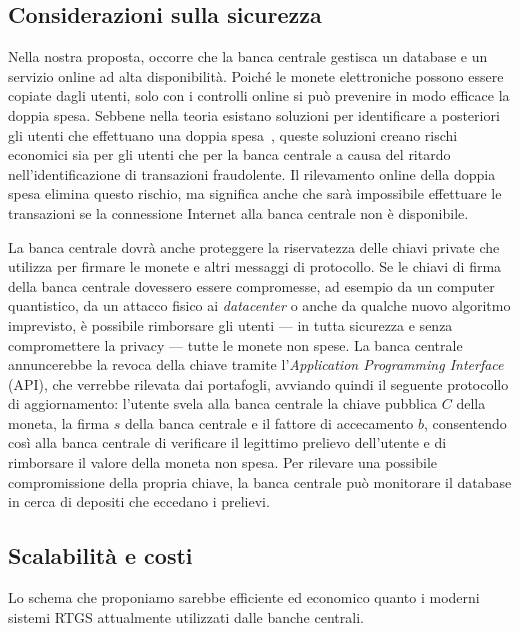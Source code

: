 \documentclass{article}
\begin{document}
\hypertarget{considerazioni-sulla-sicurezza}{%
\subsection{Considerazioni sulla sicurezza}
\label{considerazioni-sulla-sicurezza}}

Nella nostra proposta, occorre che la banca centrale gestisca un 
database e un servizio online ad alta disponibilità. Poiché le monete 
elettroniche possono essere copiate dagli utenti, solo con i controlli 
online si può prevenire in modo efficace la doppia spesa. Sebbene 
nella teoria esistano soluzioni per identificare a posteriori gli 
utenti che effettuano una doppia spesa~\cite[vedi][]{Chaum1990}, 
queste soluzioni creano rischi economici sia per gli utenti che per la 
banca centrale a causa del ritardo nell'identificazione di 
transazioni fraudolente. Il rilevamento online della doppia spesa 
elimina questo rischio, ma significa anche che sarà impossibile 
effettuare le transazioni se la connessione Internet alla banca 
centrale non è disponibile.

La banca centrale dovrà anche proteggere la riservatezza delle chiavi 
private che utilizza per firmare le monete e altri messaggi di 
protocollo. Se le chiavi di firma della banca centrale dovessero 
essere compromesse, ad esempio da un computer quantistico, da un 
attacco fisico ai \textit{datacenter} o anche da qualche nuovo algoritmo 
imprevisto, è possibile rimborsare gli utenti --- in tutta sicurezza e 
senza compromettere la privacy --- tutte le monete non spese. La banca 
centrale annuncerebbe la revoca della chiave tramite l'\textit{Application 
Programming Interface} (API), che verrebbe rilevata dai portafogli, 
avviando quindi il seguente protocollo di aggiornamento: l'utente 
svela alla banca centrale la chiave pubblica $C$ della moneta, la firma 
$s$ della banca centrale e il fattore di accecamento $b$, consentendo così 
alla banca centrale di verificare il legittimo prelievo dell'utente e 
di rimborsare il valore della moneta non spesa. Per rilevare una 
possibile compromissione della propria chiave, la banca centrale può 
monitorare il database in cerca di depositi che eccedano i prelievi. 

\subsection{Scalabilità e costi}\label{scalabilità-e-costi}

Lo schema che proponiamo sarebbe efficiente ed economico quanto i 
moderni sistemi RTGS attualmente utilizzati dalle banche centrali.
\end{document}

